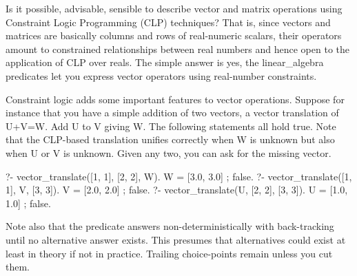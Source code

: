 Is it possible, advisable, sensible to describe vector and matrix
operations using Constraint Logic Programming (CLP) techniques? That
is, since vectors and matrices are basically columns and rows of
real-numeric scalars, their operators amount to constrained
relationships between real numbers and hence open to the application
of CLP over reals. The simple answer is yes, the linear_algebra
predicates let you express vector operators using real-number
constraints.

Constraint logic adds some important features to vector operations.
Suppose for instance that you have a simple addition of two vectors,
a vector translation of U+V=W. Add U to V giving W. The following
statements all hold true. Note that the CLP-based translation unifies
correctly when W is unknown but also when U or V is unknown. Given
any two, you can ask for the missing vector.

\begin{code}
?- vector_translate([1, 1], [2, 2], W).
W = [3.0, 3.0] ;
false.
?- vector_translate([1, 1], V, [3, 3]).
V = [2.0, 2.0] ;
false.
?- vector_translate(U, [2, 2], [3, 3]).
U = [1.0, 1.0] ;
false.
\end{code}

Note also that the predicate answers non-deterministically with
back-tracking until no alternative answer exists. This presumes that
alternatives could exist at least in theory if not in practice.
Trailing choice-points remain unless you cut them.\vspace{0.7cm}


